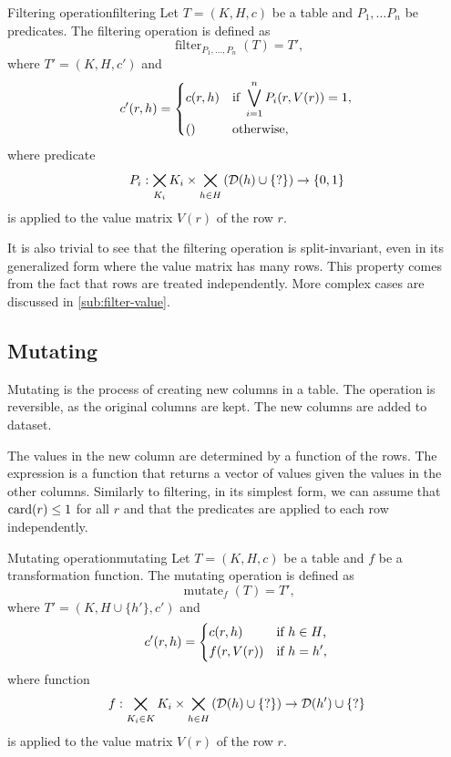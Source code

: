 \begin{defbox}{Filtering operation}{filtering}
  Let $T = (K, H, c)$ be a table and $P_1, \dots P_n$ be predicates.  The
  filtering operation is defined as \[
    \operatorname{filter}_{P_1, \dots, P_n}(T) = T'\text{,}
  \] where $T' = (K, H, c')$ and \[
    c'(r, h) = \begin{dcases}
      c(r, h) & \text{if } \bigvee_{i = 1}^{n} P_i(r, V(r)) = 1\text{,} \\
      () & \text{otherwise}\text{,}
    \end{dcases}
  \] where predicate $$P_i : \bigtimes_{K_i} K_i \times
  \bigtimes_{h\in H}\left(\domainof{h} \cup \{?\}\right) \to \{0, 1\}$$ is applied to the value
  matrix $V(r)$ of the row $r$.
\end{defbox}

It is also trivial to see that the filtering operation is split-invariant, even in its
generalized form where the value matrix has many rows.  This property comes from the fact
that rows are treated independently.  More complex cases are discussed in
\cref{sub:filter-value}.

\subsection{Mutating}

Mutating is the process of creating new columns in a table.  The operation is reversible,
as the original columns are kept.  The new columns are added to dataset.

The values in the new column are determined by a function of the rows.  The expression is
a function that returns a vector of values given the values in the other columns.
Similarly to filtering, in its simplest form, we can assume that $\rowcard[r] \leq 1$ for
all $r$ and that the predicates are applied to each row independently.

\begin{defbox}{Mutating operation}{mutating}
  Let $T = (K, H, c)$ be a table and $f$ be a transformation function.  The mutating
  operation is defined as \[
    \operatorname{mutate}_{f}(T) = T'\text{,}
  \] where $T' = (K, H \cup \{ h' \}, c')$ and \[
    c'(r, h) = \begin{dcases}
      c(r, h) & \text{if } h \in H\text{,} \\
      f(r, V(r)) & \text{if } h = h'\text{,}
    \end{dcases}
  \] where function $$f : \bigtimes_{K_i \in K} K_i \times \bigtimes_{h\in H}
  \left(\domainof{h} \cup \{?\}\right) \to \domainof{h'} \cup \{?\}$$ is applied to the
  value matrix $V(r)$ of the row $r$.
\end{defbox}

